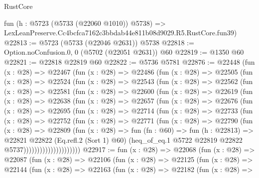 \begin{lexlean}{RustCore}
\begin{coremodule}
    fun (h : @5723 (@5733 (@22060 @1010)) @5738) =>
    LexLeanPreserve.Cc4bcfca7162c3bbdab44e811b08d9029.R5.RustCore.fun39)
@22813 := @5723 (@5733 (@22046 @2631)) @5738
@22818 := Option.noConfusion.{0, 0} (@5702 (@22051 @2631)) @60
@22819 := @1350 @60
@22821 := @22818 @22819 @60
@22822 := @5736 @5781
@22876 := @22448
    (fun (x : @28) =>
    @22467
      (fun (x : @28) =>
      @22486
        (fun (x : @28) =>
        @22505
          (fun (x : @28) =>
          @22524
            (fun (x : @28) =>
            @22543
              (fun (x : @28) =>
              @22562
                (fun (x : @28) =>
                @22581
                  (fun (x : @28) =>
                  @22600
                    (fun (x : @28) =>
                    @22619
                      (fun (x : @28) =>
                      @22638
                        (fun (x : @28) =>
                        @22657
                          (fun (x : @28) =>
                          @22676
                            (fun (x : @28) =>
                            @22695
                              (fun (x : @28) =>
                              @22714
                                (fun (x : @28) =>
                                @22733
                                  (fun (x : @28) =>
                                  @22752
                                    (fun (x : @28) =>
                                    @22771
                                      (fun (x : @28) =>
                                      @22790
                                        (fun (x : @28) =>
                                        @22809
                                          (fun (x : @28) =>
                                          fun (fn : @60) =>
                                          fun (h : @22813) =>
                                          @22821
                                            @22822
                                            (Eq.refl.{2} (Sort 1) @60)
                                            (heq_of_eq.{1}
                                              @5722
                                              @22819
                                              @22822
                                              @5737)))))))))))))))))))))
@22917 := fun (x : @28) =>
  @22068
    (fun (x : @28) =>
    @22087
      (fun (x : @28) =>
      @22106
        (fun (x : @28) =>
        @22125
          (fun (x : @28) =>
          @22144
            (fun (x : @28) =>
            @22163
              (fun (x : @28) =>
              @22182
                (fun (x : @28) =>

\end{coremodule}
\end{lexlean}
